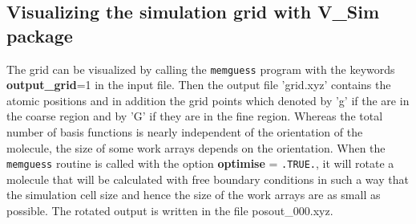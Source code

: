 \documentclass[a4paper,11pt]{report}
\begin{document}
\subsection{Visualizing the simulation grid with V\_Sim package}
The grid can be visualized by calling the \texttt{memguess} program 
with the keywords {\bf output\_grid}=1 in the input file. Then the output file 'grid.xyz' contains the atomic positions and in addition 
the grid points which denoted by 'g' if the are in the coarse region and by 'G' if they are in the fine region. 
Whereas the total number of basis functions is nearly independent of the orientation of the molecule, the size of some 
work arrays depends on the orientation. When the \texttt{memguess} routine is called with the option {\bf optimise} = \texttt{.TRUE.}, it will rotate 
a molecule that will be calculated with free boundary conditions in such a way that the simulation cell size and 
hence the size of the work arrays are as small as 
possible. The rotated output is written in the file posout\_000.xyz.
\end{document}
